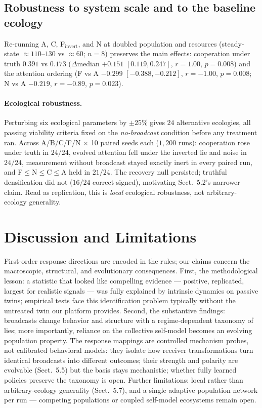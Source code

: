 \documentclass{svproc}
\begin{document}
\subsection{Robustness to system scale and to the baseline ecology}
Re-running A, C, F$_{\mathrm{invert}}$, and N at doubled
population and resources (steady-state $\approx 110$--$130$ vs $\approx 60$;
$n=8$) preserves the main effects: cooperation under truth $0.391$ vs
$0.173$ ($\Delta$median $+0.151$ $[0.119, 0.247]$, $r=1.00$, $p=0.008$) and
the attention ordering (F vs A $-0.299$ $[-0.388, -0.212]$, $r=-1.00$,
$p=0.008$; N vs A $-0.219$, $r=-0.89$, $p=0.023$).

\paragraph{Ecological robustness.} Perturbing six ecological parameters by
$\pm25\%$ gives $24$ alternative ecologies, all passing viability criteria fixed
on the \emph{no-broadcast} condition before any treatment ran. Across A/B/C/F/N $\times$ 10 paired seeds each ($1{,}200$ runs):
cooperation rose under truth in $24/24$, evolved attention fell under the
inverted lie and noise in $24/24$, measurement without broadcast stayed
exactly inert in every paired run, and F$\leq$N$\leq$C$\leq$A held in
$21/24$. The recovery null persisted; truthful densification did not ($16/24$
correct-signed), motivating Sect.~5.2's narrower claim. Read as
replication, this is \emph{local} ecological robustness, not
arbitrary-ecology generality.

\section{Discussion and Limitations}
First-order response directions are encoded in the rules; our claims
concern the macroscopic, structural, and evolutionary consequences. First,
the methodological lesson: a statistic that looked like compelling
evidence --- positive, replicated, largest for realistic signals --- was fully
explained by intrinsic dynamics on passive twins; empirical tests face this
identification problem \cite{cheng2024causal} typically without the
untreated twin our platform provides. Second, the substantive findings:
broadcasts change behavior and structure with a regime-dependent taxonomy of
lies; more importantly, reliance on the collective self-model becomes an
evolving population property.
The response mappings are controlled mechanism probes, not calibrated
behavioral models: they isolate how receiver transformations turn identical
broadcasts into different outcomes; their strength and polarity are evolvable
(Sect.~5.5) but the basis stays mechanistic; whether fully learned policies
preserve the taxonomy is open. Further limitations: local rather
than arbitrary-ecology generality (Sect.~5.7), and a single adaptive
population network per run --- competing populations or coupled self-model
ecosystems remain open.
\end{document}
